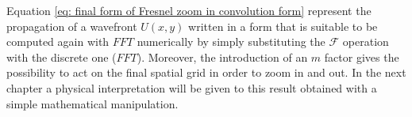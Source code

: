 \documentclass{iucr}              %
\begin{document}
Equation \ref{eq: final form of Fresnel zoom in convolution form} represent the propagation of a wavefront $U(x,y)$ written in a form that is suitable to be computed again with $FFT$ numerically by simply substituting the $\mathcal{F}$ operation with the discrete one ($FFT$). Moreover, the introduction of an $m$ factor gives the possibility to act on the final spatial grid in order to zoom in and out. In the next chapter a physical interpretation will be given to this result obtained with a simple mathematical manipulation.









%

% 
% 
% 
% 
\end{document}
